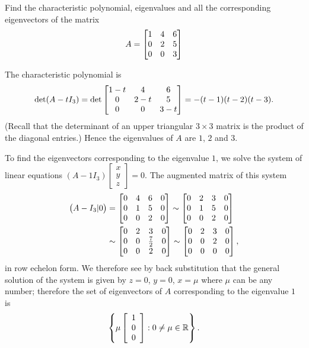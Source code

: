 \documentclass[a4paper]{amsart}
\renewenvironment{solution}{\SolutionInline}{\endSolutionInline}
\begin{document}
\begin{exercise}\label{ex-evectors-i}
 Find the characteristic polynomial, eigenvalues and all the corresponding
 eigenvectors of the matrix
 \[ A = \left[\begin{matrix} 1 & 4 & 6 \\ 0 & 2 & 5 \\ 0 & 0 & 3 \end{matrix}\right] \]
\end{exercise}
\begin{solution}
 The characteristic polynomial is
    $$ \det (A - tI_3) =
    \det \left[\begin{matrix}
    1-t & 4 & 6 \\
    0 & 2-t & 5 \\
    0 & 0 & 3-t
    \end{matrix}\right]=-(t-1)(t-2)(t-3).
    $$
 (Recall that the determinant of an upper triangular $3 \times 3$
 matrix is the product of the diagonal entries.) Hence the
 eigenvalues of $A$ are $1$, $2$ and $3$.

 To find the eigenvectors corresponding to the eigenvalue $1$, we
 solve the system of linear equations $(A - 1I_3)\left[
 \begin{array}{c}x \\ y\\z
 \end{array} \right] = 0$. The augmented matrix of this system
 \begin{align*}
 \big(A - I_3|0\big) & = \left[\begin{matrix} 0& 4&
 6&0\\0&1&5&0\\0&0&2&0\end{matrix}\right] \sim \left[\begin{matrix} 0& 2&
 3&0\\0&1&5&0\\0&0&2&0\end{matrix}\right]\\& \sim \left[\begin{matrix} 0& 2&
 3&0\\0&0&\frac{7}{2}&0\\0&0&2&0\end{matrix}\right] \sim \left[\begin{matrix}
 0& 2& 3&0\\0&0&2&0\\0&0&0&0\end{matrix}\right],
 \end{align*}
 in row echelon form. We therefore see by back substitution that
 the general solution of the system is given by $z = 0$, $y = 0$,
 $x = \mu$ where $\mu$ can be any number; therefore the set of
 eigenvectors of $A$ corresponding to the eigenvalue $1$ is
 $$
 \left\{ \mu \left[ \begin{array}{c} 1\\0\\0
 \end{array} \right] : 0 \neq \mu \in {\mathbb{R}} \right\}.
 $$


\end{solution}
\end{document}
